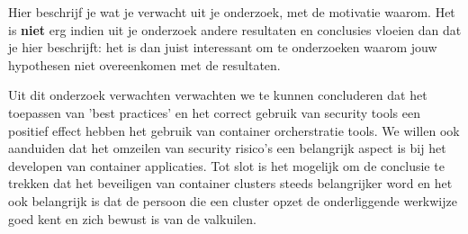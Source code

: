 Hier beschrijf je wat je verwacht uit je onderzoek, met de motivatie waarom. Het is \textbf{niet} erg indien uit je onderzoek andere resultaten en conclusies vloeien dan dat je hier beschrijft: het is dan juist interessant om te onderzoeken waarom jouw hypothesen niet overeenkomen met de resultaten.

Uit dit onderzoek verwachten verwachten we te kunnen concluderen dat het toepassen van 'best practices' en het correct gebruik van security tools een positief effect hebben het gebruik van container orcherstratie tools.
We willen ook aanduiden dat het omzeilen van security risico's een belangrijk aspect is bij het developen van container applicaties. 
Tot slot is het mogelijk om de conclusie te trekken dat het beveiligen van container clusters steeds belangrijker word en het ook belangrijk is dat de persoon die een cluster opzet de onderliggende werkwijze goed kent en zich bewust is van de valkuilen.
